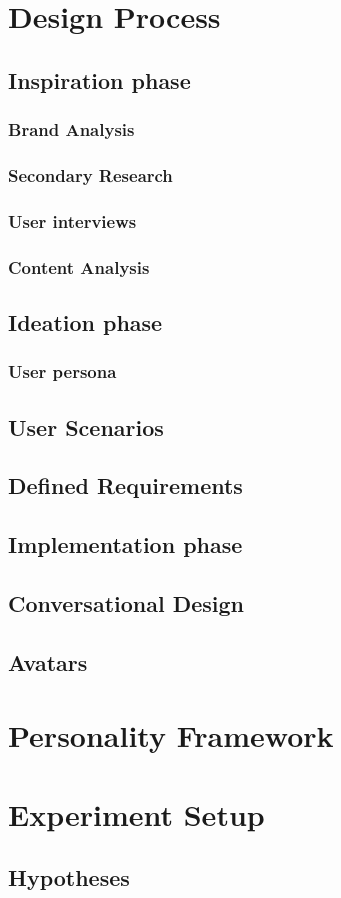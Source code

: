 \section{Design Process}

\subsection{Inspiration phase}

    \subsubsection{Brand Analysis}
    \subsubsection{Secondary Research}
    \subsubsection{User interviews}
    \subsubsection{Content Analysis}

\subsection{Ideation phase}
    \subsubsection{User persona}
    \subsection{User Scenarios}
    \subsection{Defined Requirements}

\subsection{Implementation phase}
    \subsection{Conversational Design}
    \subsection{Avatars}

\section{Personality Framework}

\section{Experiment Setup}

    \subsection{Hypotheses}